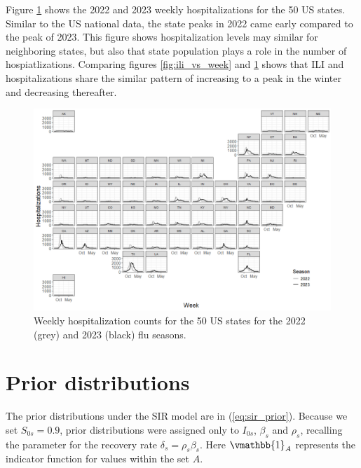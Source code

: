 \documentclass[ba]{imsart}
\theoremstyle{plain}
\theoremstyle{definition}
\theoremstyle{remark}
\begin{document}
\begin{supplement}
Figure \ref{fig:hosp_vs_week} shows the 2022 and 2023 weekly hospitalizations 
for the 50 US states. Similar to the US national data, 
the state peaks in 2022 came early compared to the peak of 2023. 
This figure shows hospitalization levels may similar for neighboring states,
but also that state population plays a role in the number of hospiatlizations.
Comparing figures 
\ref{fig:ili_vs_week} and \ref{fig:hosp_vs_week} shows that ILI and 
hospitalizations share the similar pattern of increasing to a peak in the 
winter and decreasing thereafter. 

\begin{figure}[hbt!]
    \centering
    \includegraphics[scale=.5]{Images/hosp_vs_week.png}
    \caption{Weekly hospitalization counts for the 50 US states for the 2022 
    (grey) and 2023 (black) flu seasons.}
    \label{fig:hosp_vs_week}
\end{figure}













\section{Prior distributions} \label{app:B_prior}

The prior distributions under the SIR model are in (\ref{eq:sir_prior}).
Because we set $S_{0s} = 0.9$, prior distributions were assigned only to
$I_{0s}$, $\beta_s$ and $\rho_s$, recalling the parameter for the recovery
rate $\delta_s = \rho_s \beta_s$. Here $\vmathbb{1}_{A}$ represents the
indicator function for values within the set $A$.


\end{supplement}
\end{document}
